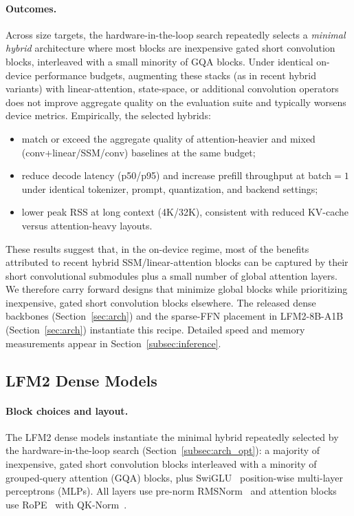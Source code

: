 \documentclass{article}
\begin{document}
\paragraph{Outcomes.}
Across size targets, the hardware-in-the-loop search repeatedly selects a \emph{minimal hybrid} architecture where most blocks are inexpensive gated short convolution blocks, interleaved with a small minority of GQA blocks. Under identical on-device performance budgets, augmenting these stacks (as in recent hybrid variants) with linear-attention, state-space, or additional convolution operators  does not improve aggregate quality on the evaluation suite and typically worsens device metrics. Empirically, the selected hybrids:
\begin{itemize}
  \item match or exceed the aggregate quality of attention-heavier and mixed (conv{+}linear/SSM/conv) baselines at the same budget;
  \item reduce decode latency (p50/p95) and increase prefill throughput at batch$=1$ under identical tokenizer, prompt, quantization, and backend settings;
  \item lower peak RSS at long context (4K/32K), consistent with reduced KV-cache versus attention-heavy layouts.
\end{itemize}

These results suggest that, in the on-device regime, most of the benefits attributed to recent hybrid SSM/linear-attention blocks can be captured by their short convolutional submodules plus a small number of global attention layers. We therefore carry forward designs that minimize global blocks while prioritizing inexpensive, gated short convolution blocks elsewhere. The released dense backbones (Section~\ref{sec:arch}) and the sparse-FFN placement in LFM2-8B-A1B (Section~\ref{sec:arch}) instantiate this recipe. Detailed speed and memory measurements appear in Section~\ref{subsec:inference}.



\subsection{LFM2 Dense Models}
\label{subsec:dense}

\paragraph{Block choices and layout.}
The LFM2 dense models instantiate the minimal hybrid repeatedly selected by the hardware-in-the-loop search (Section~\ref{subsec:arch_opt}): a majority of inexpensive, gated short convolution blocks interleaved with a minority of grouped-query attention (\textsc{GQA}) blocks, plus SwiGLU~\citep{shazeer2020glu} position-wise multi-layer perceptrons (MLPs). All layers use pre-norm RMSNorm~\citep{zhang2019root} and attention blocks use RoPE~\citep{su2024roformer} with QK-Norm~\citep{dehghani2023scaling}. 
\end{document}
